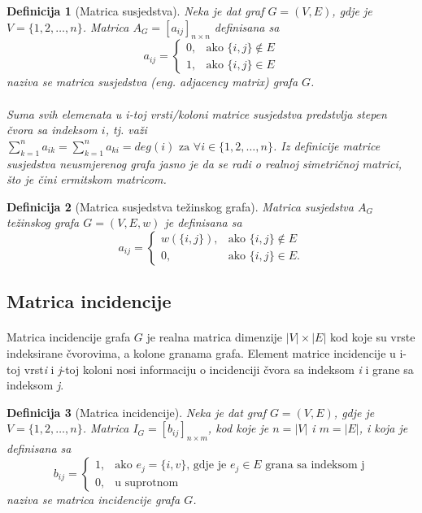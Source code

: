 \documentclass[11pt]{article}
\newtheorem{definition}{Definicija}
\begin{document}
			\begin{definition}[Matrica susjedstva] 
			Neka je dat graf $G = (V, E)$, gdje je $V = \{1, 2, \dots, n\}$. Matrica $A_G = [a_{ij}]_{n \times n}$ definisana sa
			 \[
				 a_{ij} =
				 \begin{cases} 
				 0, & \text{ako } \{i, j\} \notin E \\ 
				 1, & \text{ako } \{i, j\} \in E
				 \end{cases}
			 \]
			naziva se matrica susjedstva (eng. adjacency matrix) grafa $G$.
				\paragraph{}
				Suma svih elemenata u i-toj vrsti/koloni matrice susjedstva predstvlja stepen čvora sa indeksom $i$,
				tj. važi $\sum_{k=1}^{n}a_{ik} = \sum_{k=1}^{n}a_{ki} = deg(i) \text{ za } \forall i \in \{1,2, \dots, n\}$.
				Iz definicije matrice susjedstva neusmjerenog grafa jasno je da se radi o realnoj simetričnoj matrici, što je čini ermitskom matricom. 
			\end{definition}
	
			\begin{definition}[Matrica susjedstva težinskog grafa] 
			Matrica susjedstva $A_G$ težinskog grafa  $G = (V, E, w)$ je definisana sa
			\[
				a_{ij} =
				\begin{cases} 
				w(\{i,j\}), & \text{ako } \{i, j\} \notin E \\ 
				0, & \text{ako } \{i, j\} \in E.
				\end{cases}
			\]
			\end{definition}
	
		\subsection{Matrica incidencije}
		\paragraph{}
		Matrica incidencije grafa $G$ je realna matrica dimenzije $|V| \times |E|$ kod koje su vrste indeksirane čvorovima, a kolone granama grafa.
		Element matrice incidencije u i-toj vrst\emph{i} i \emph{j}-toj koloni nosi informaciju o incidenciji čvora sa indeksom \emph{i} i grane sa indeksom \emph{j}.
	
			\begin{definition}[Matrica incidencije] 
			Neka je dat graf $G = (V, E)$, gdje je $V = \{1, 2, \dots, n\}$. Matrica $I_G = [b_{ij}]_{n \times m}$, kod koje je $n = |V|$ i $m = |E|$, i koja je definisana sa
			 \[
				 b_{ij} =
				 \begin{cases}
				 1, & \text{ako } e_j = \{i,v\} \text{, gdje je } e_j \in E \text{ grana sa indeksom j} \\
				 0, & \text{u suprotnom}
				 \end{cases}
			 \]
			naziva se matrica incidencije grafa $G$.
			\end{definition}
	
\end{document}
